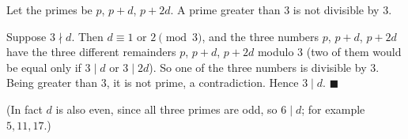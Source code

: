 Let the primes be $p$, $p+d$, $p+2d$. A prime greater than $3$ is not divisible by $3$.

Suppose $3\nmid d$. Then $d\equiv1$ or $2\pmod3$, and the three numbers $p$, $p+d$, $p+2d$ have the three different remainders $p$, $p+d$, $p+2d$ modulo $3$ (two of them would be equal only if $3\mid d$ or $3\mid2d$). So one of the three numbers is divisible by $3$. Being greater than $3$, it is not prime, a contradiction. Hence $3\mid d$. $\blacksquare$

(In fact $d$ is also even, since all three primes are odd, so $6\mid d$; for example $5,11,17$.)
